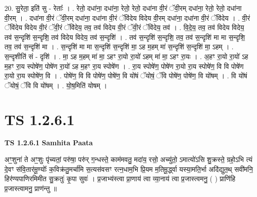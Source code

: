 \documentclass[17pt]{extarticle}
\begin{document}
20. सु॒रेता॒ इति॑ सु - रेताः᳚ । . रेतो॒ दधा॑ना॒ दधा॑ना॒ रेतो॒ रेतो॒ दधा॑ना वी॒रं ॅवी॒रम् दधा॑ना॒ रेतो॒ रेतो॒ दधा॑ना वी॒रम् । . दधा॑ना वी॒रं ॅवी॒रम् दधा॑ना॒ दधा॑ना वी॒रं ॅवि॑देय विदेय वी॒रम् दधा॑ना॒ दधा॑ना वी॒रं ॅवि॑देय । . वी॒रं ॅवि॑देय विदेय वी॒रं ॅवी॒रं ॅवि॑देय॒ तव॒ तव॑ विदेय वी॒रं ॅवी॒रं ॅवि॑देय॒ तव॑ । . वि॒दे॒य॒ तव॒ तव॑ विदेय विदेय॒ तव॑ स॒न्दृशि॑ स॒न्दृशि॒ तव॑ विदेय विदेय॒ तव॑ स॒न्दृशि॑ । . तव॑ स॒न्दृशि॑ स॒न्दृशि॒ तव॒ तव॑ स॒न्दृशि॑ मा मा स॒न्दृशि॒ तव॒ तव॑ स॒न्दृशि॑ मा । . स॒न्दृशि॑ मा मा स॒न्दृशि॑ स॒न्दृशि॑ मा॒ ऽह म॒हम् मा॑ स॒न्दृशि॑ स॒न्दृशि॑ मा॒ ऽहम् । . स॒न्दृशीति॑ सं - दृशि॑ । . मा॒ ऽह म॒हम् मा॑ मा॒ ऽहꣳ रा॒यो रा॒यो॑ ऽहम् मा॑ मा॒ ऽहꣳ रा॒यः । . अ॒हꣳ रा॒यो रा॒यो॑ ऽह म॒हꣳ रा॒य स्पोषे॑ण॒ पोषे॑ण रा॒यो॑ ऽह म॒हꣳ रा॒य स्पोषे॑ण । . रा॒य स्पोषे॑ण॒ पोषे॑ण रा॒यो रा॒य स्पोषे॑ण॒ वि वि पोषे॑ण रा॒यो रा॒य स्पोषे॑ण॒ वि । . पोषे॑ण॒ वि वि पोषे॑ण॒ पोषे॑ण॒ वि यो॑षं ॅयोषं॒ ॅवि पोषे॑ण॒ पोषे॑ण॒ वि यो॑षम् । . वि यो॑षं ॅयोषं॒ ॅवि वि यो॑षम् । . यो॒ष॒मिति॑ योषम् । \newline
\pagebreak
{}
\section*{ TS 1.2.6.1 }

\textbf{TS 1.2.6.1 } \newline
\textbf{Samhita Paata} \newline

अꣳ॒॒शुना॑ ते अꣳ॒॒शुः पृ॑च्यतां॒ परु॑षा॒ परु॑र् ग॒न्धस्ते॒ काम॑मवतु॒ मदा॑य॒ रसो॒ अच्यु॑तो॒ ऽमात्यो॑ऽसि शु॒क्रस्ते॒ ग्रहो॒ऽभि त्यं दे॒वꣳ स॑वि॒तार॑मू॒ण्योः᳚ क॒विक्र॑तु॒मर्चा॑मि स॒त्यस॑वसꣳ रत्न॒धाम॒भि प्रि॒यम म॒तिमू॒र्द्ध्वा यस्या॒मति॒र्भा अदि॑द्युत॒थ् सवी॑मनि॒ हिर॑ण्यपाणिरमिमीत सु॒क्रतुः॑ कृ॒पा सुवः॑ । प्र॒जाभ्य॑स्त्वा प्रा॒णाय॑ त्वा व्या॒नाय॑ त्वा प्र॒जास्त्वमनु॒ ( ) प्राणि॑हि प्र॒जास्त्वामनु॒ प्राण॑न्तु ॥ \newline
\end{document}
